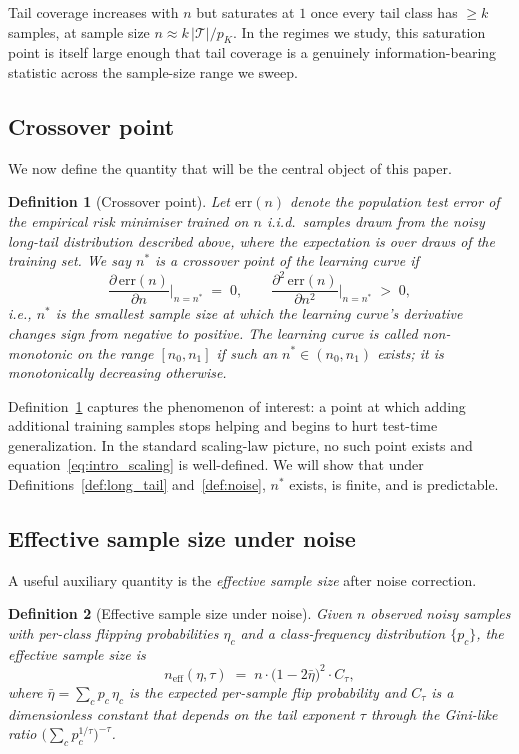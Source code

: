 \documentclass[11pt]{article}
\newtheorem{definition}{Definition}
\begin{document}
Tail coverage increases with $n$ but saturates at $1$ once every tail class has $\ge k$ samples, at sample size $n \approx k \, |\mathcal{T}| / p_{K}$. In the regimes we study, this saturation point is itself large enough that tail coverage is a genuinely information-bearing statistic across the sample-size range we sweep.

\subsection{Crossover point}

We now define the quantity that will be the central object of this paper.

\begin{definition}[Crossover point]
\label{def:crossover}
Let $\mathrm{err}(n)$ denote the population test error of the empirical risk minimiser trained on $n$ i.i.d.\ samples drawn from the noisy long-tail distribution described above, where the expectation is over draws of the training set. We say $n^{*}$ is a \emph{crossover point} of the learning curve if
\[
\frac{\partial \, \mathrm{err}(n)}{\partial n} \Big|_{n = n^{*}} \;=\; 0, \qquad \frac{\partial^2 \, \mathrm{err}(n)}{\partial n^2} \Big|_{n = n^{*}} \; > \; 0,
\]
i.e., $n^{*}$ is the smallest sample size at which the learning curve's derivative changes sign from negative to positive. The learning curve is called \emph{non-monotonic} on the range $[n_0, n_1]$ if such an $n^{*} \in (n_0, n_1)$ exists; it is \emph{monotonically decreasing} otherwise.
\end{definition}

Definition~\ref{def:crossover} captures the phenomenon of interest: a point at which adding additional training samples stops helping and begins to hurt test-time generalization. In the standard scaling-law picture, no such point exists and equation~\eqref{eq:intro_scaling} is well-defined. We will show that under Definitions~\ref{def:long_tail} and~\ref{def:noise}, $n^{*}$ exists, is finite, and is predictable.

\subsection{Effective sample size under noise}

A useful auxiliary quantity is the \emph{effective sample size} after noise correction.

\begin{definition}[Effective sample size under noise]
\label{def:n_eff}
Given $n$ observed noisy samples with per-class flipping probabilities $\eta_c$ and a class-frequency distribution $\{p_c\}$, the effective sample size is
\begin{equation}
n_{\mathrm{eff}}(\eta, \tau) \;=\; n \cdot \bigl(1 - 2\bar{\eta}\bigr)^{2} \cdot C_{\tau}, \label{eq:n_eff}
\end{equation}
where $\bar{\eta} = \sum_c p_c \, \eta_c$ is the expected per-sample flip probability and $C_{\tau}$ is a dimensionless constant that depends on the tail exponent $\tau$ through the Gini-like ratio $\bigl(\sum_c p_c^{1/\tau}\bigr)^{-\tau}$.
\end{definition}
\end{document}

